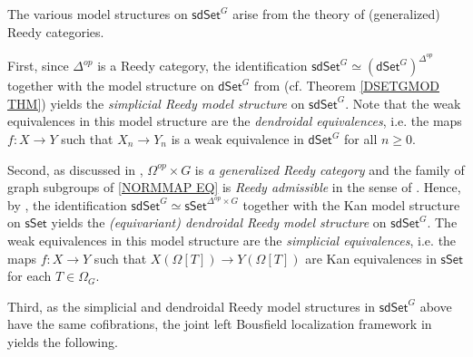 \documentclass[a4paper,10pt
,draft
]{article}%
\numberwithin{equation}{section}
\numberwithin{figure}{section}
\theoremstyle{definition} %
\newcommand{\dSet}{\mathsf{dSet}}
\newcommand{\1}{\ensuremath{\mathbbm 1}}%
\begin{document}
The various model structures on $\mathsf{sdSet}^G$ arise
from the theory of (generalized) Reedy categories.


First, since $\Delta^{op}$ is a Reedy category,
the identification
$\mathsf{sdSet}^G \simeq 
\left(\mathsf{dSet}^G\right)^{\Delta^{op}}$
together with the model structure on 
$\mathsf{dSet}^G$ from \cite{Per18}
(cf. Theorem \ref{DSETGMOD THM})
yields the 
\textit{simplicial Reedy model structure} on $\mathsf{sdSet}^G$.
Note that the weak equivalences in this model structure
are the \textit{dendroidal equivalences},
i.e. the maps
$f \colon X \to Y$
such that $X_n \to Y_n$ is a weak equivalence in $\dSet^G$ for all $n \geq 0$.

Second, as discussed in 
\cite[Ex. A.7]{BP_edss},
$\Omega^{op} \times G$ is \emph{a generalized Reedy category}
and the family of graph subgroups of \eqref{NORMMAP EQ} is
\emph{Reedy admissible}
in the sense of \cite[Ex. A.2]{BP_edss}.
Hence, by \cite[Thm. A.8]{BP_edss},
the identification 
$\mathsf{sdSet}^G \simeq 
\mathsf{sSet}^{\Delta^{op} \times G}$
together with the Kan model structure on 
$\mathsf{sSet}$
yields the 
\textit{(equivariant) dendroidal Reedy model structure} on $\mathsf{sdSet}^G$.
The weak equivalences in this model structure are the
\emph{simplicial equivalences},
i.e. the maps $f \colon X \to Y$
such that 
$X(\Omega[T]) \to Y(\Omega[T])$
are Kan equivalences in $\mathsf{sSet}$
for each $T \in \Omega_G$.

Third, as the simplicial and dendroidal Reedy model structures
in $\mathsf{sdSet}^G$ above have the same cofibrations,
the joint left Bousfield localization framework in 
\cite[\S 4.1]{BP_edss}
yields the following.
\end{document}
